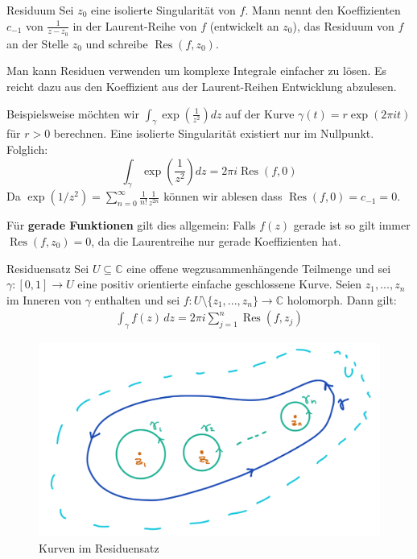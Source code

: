 \documentclass[a4paper,10pt]{article}
\DeclareMathOperator{\Res}{Res}
\begin{document}
\begin{mainbox}{Residuum}
  Sei \(z_0\) eine isolierte Singularität von \(f\). Mann nennt den Koeffizienten \(c_{-1}\) von \(\frac{1}{z-z_0}\) in der Laurent-Reihe von \(f\) (entwickelt an $z_0$), das Residuum von \(f\) an der Stelle \(z_0\) und schreibe \(\operatorname{Res}(f,z_0)\).
\end{mainbox}

Man kann Residuen verwenden um komplexe Integrale einfacher zu lösen. Es reicht dazu aus den Koeffizient aus der Laurent-Reihen Entwicklung abzulesen.

Beispielsweise möchten wir $\int_\gamma \exp(\frac{1}{z^2}) dz$ auf der Kurve $\gamma(t) = r \exp(2\pi i t)$ für $r > 0$ berechnen. Eine isolierte Singularität existiert nur im Nullpunkt. Folglich:
$$
\int_\gamma \exp \left( \frac{1}{z^2} \right) dz = 2\pi i \Res(f, 0)
$$
Da $\exp(1/z^2) = \sum_{n=0}^\infty \frac{1}{n!} \frac{1}{z^{2n}}$ können wir ablesen dass $\Res(f, 0) = c_{-1} = 0$.

Für \textbf{gerade Funktionen} gilt dies allgemein: Falls $f(z)$ gerade ist so gilt immer $\Res(f, z_0) = 0$, da die Laurentreihe nur gerade Koeffizienten hat.

\begin{mainbox}{Residuensatz}
  Sei \(U \subseteq \mathbb{C}\) eine offene wegzusammenhängende Teilmenge und sei \(\gamma : [0,1] \to U\) eine positiv orientierte einfache geschlossene Kurve. Seien \(z_1,...,z_n\) im Inneren von \(\gamma\) enthalten und sei \(f \colon U \setminus \{z_1,...,z_n\} \to \mathbb{C}\) holomorph. Dann gilt: \begin{align*}  \int_{\gamma} f(z)\,dz = 2\pi i \sum_{j=1}^n \operatorname{Res}(f,z_j) \end{align*}
\end{mainbox}


\begin{figure}[H]
  \centering 
  \includegraphics[width=0.9\linewidth]{assets/4-2-1.png}
  \caption{Kurven im Residuensatz}
\end{figure}
\end{document}
